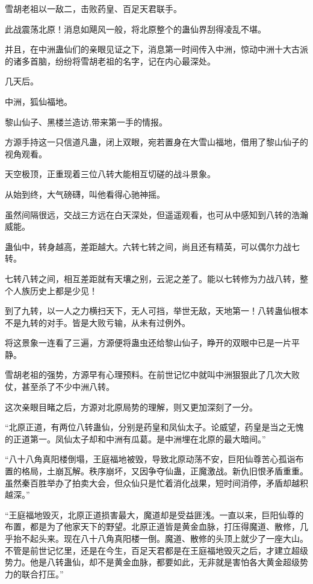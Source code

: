 
\begin{this_body}



雪胡老祖以一敌二，击败药皇、百足天君联手。

此战震荡北原！消息如飓风一般，将北原整个的蛊仙界刮得凌乱不堪。

并且，在中洲蛊仙们的亲眼见证之下，消息第一时间传入中洲，惊动中洲十大古派的诸多首脑，纷纷将雪胡老祖的名字，记在内心最深处。

几天后。

中洲，狐仙福地。

黎山仙子、黑楼兰造访,带来第一手的情报。

方源手持这一只信道凡蛊，闭上双眼，宛若置身在大雪山福地，借用了黎山仙子的视角观看。

天空极顶，正重现着三位八转大能相互切磋的战斗景象。

从始到终，大气磅礴，叫他看得心驰神摇。

虽然间隔很远，交战三方远在白天深处，但遥遥观看，也可从中感知到八转的浩瀚威能。

蛊仙中，转身越高，差距越大。六转七转之间，尚且还有精英，可以偶尔力战七转。

七转八转之间，相互差距就有天壤之别，云泥之差了。能以七转修为力战八转，整个人族历史上都是少见！

到了九转，以一人之力横扫天下，无人可挡，举世无敌，天地第一！八转蛊仙根本不是九转的对手。皆是大败亏输，从未有过例外。

将这景象一连看了三遍，方源便将蛊虫还给黎山仙子，睁开的双眼中已是一片平静。

雪胡老祖的强势，方源早有心理预料。在前世记忆中就叫中洲狠狠此了几次大败仗，甚至杀了不少中洲八转。

这次亲眼目睹之后，方源对北原局势的理解，则又更加深刻了一分。

“北原正道，有两位八转蛊仙，分别是药皇和凤仙太子。论威望，药皇是当之无愧的正道第一。凤仙太子却和中洲有瓜葛。是中洲埋在北原的最大暗间。”

“八十八角真阳楼倒塌，王庭福地被毁，导致北原动荡不安，巨阳仙尊苦心孤诣布置的格局，土崩瓦解。秩序崩坏，又因争夺仙蛊，正魔激战。新仇旧恨矛盾重重。虽然秦百胜举办了拍卖大会，但众仙只是忙着消化战果，短时间消停，矛盾却越积越深。”

“王庭福地毁灭，北原正道损害最大，魔道却是受益匪浅。一直以来，巨阳仙尊的布置，都是为了他家天下的野望。北原正道皆是黄金血脉，打压得魔道、散修，几乎抬不起头来。现在八十八角真阳楼一倒。魔道、散修的头顶上就少了一座大山。不管是前世记忆里，还是在今生，百足天君都是在王庭福地毁灭之后，才建立超级势力。他是八转蛊仙，却不是黄金血脉，都要如此，无非就是害怕各大黄金超级势力的联合打压。”


\end{this_body}
